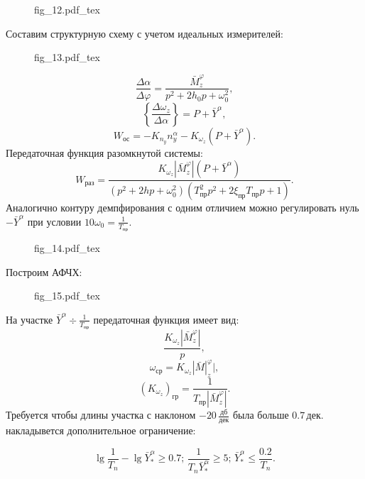 \documentclass{article}
\begin{document}
\begin{figure}[H]
	\centering
	{fig_12.pdf_tex}
\end{figure}
Составим структурную схему с учетом идеальных измерителей:
\begin{figure}[H]
	\centering
	{fig_13.pdf_tex}
\end{figure}
\[
	\frac{\Delta \alpha}{\Delta \varphi} = \frac{\bar{M}_z^\varphi}{p^2 + 2 h_0 p + \omega_0^2},
\]
\[
	\left\{ \frac{\Delta \omega_z}{\Delta \alpha}\right\} = P + \bar{Y}^\alpha,
\]
\[
	W_\text{ос} = -K_{n_y} n_y^\alpha - K_{\omega_z} (P + \bar{Y}^\alpha).
\]
Передаточная функция разомкнутой системы:
\[
	W_\text{раз} = \frac{K_{\omega_z} |\bar{M}_z^{\varphi}|(P + \bar{Y}^\alpha)}{(p^2 + 2h p + \omega_0^2)(T_\text{пр}^2 p^2 + 2 \xi_\text{пр} T_\text{пр} p + 1)}.
\]
Аналогично контуру демпфирования с одним отличием можно регулировать нуль $-\bar{Y}^\alpha$ при условии $10 \omega_0 = \frac{1}{T_\text{пр}}$.
\begin{figure}[H]
	\centering
	{fig_14.pdf_tex}
\end{figure}
Построим АФЧХ:
\begin{figure}[H]
	\centering
	{fig_15.pdf_tex}
\end{figure}
На участке $\bar{Y}^\alpha \div \frac{1}{T_\text{пр}}$ передаточная функция имеет вид:
\[
	\frac{K_{\omega_z}|\bar{M}_z^\varphi|}{p},
\]
\[
	\omega_\text{ср} = K_{\omega_z} |\bar{M}|_z^\varphi|,
\]
\[
	(K_{\omega_z})_\text{гр} = \frac{1}{T_\text{пр} |\bar{M}_z^\varphi|}.
\]
Требуется чтобы длины участка с наклоном $-20 \, \frac{\text{дб}}{\text{дек}}$ была больше $0.7 \, \text{дек}.$ накладывется дополнительное ограничение:

\[
	\lg \frac{1}{T_n} - \lg \bar{Y}^{\alpha}_* \geq 0.7;\, \frac{1}{T_n \bar{Y}^{\alpha}_*} \geq 5; \, \bar{Y}^{\alpha}_* \leq \frac{0.2}{T_n}.
\]
\end{document}
